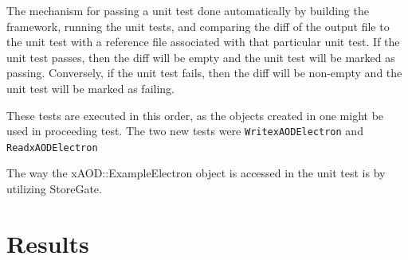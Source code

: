 The mechanism for passing a unit test done automatically by building the framework, running the unit tests, and comparing the diff of the output file to the unit test with a reference file associated with that particular unit test. 
If the unit test passes, then the diff will be empty and the unit test will be marked as passing.
Conversely, if the unit test fails, then the diff will be non-empty and the unit test will be marked as failing.


These tests are executed in this order, as the objects created in one might be used in proceeding test.
The two new tests were \verb|WritexAODElectron| and \verb|ReadxAODElectron|

The way the xAOD::ExampleElectron object is accessed in the unit test is by utilizing StoreGate. 

\section{Results}
